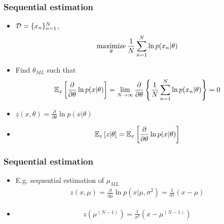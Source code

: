 \documentclass[10pt,mathserif]{beamer}
\begin{document}
\begin{frame}
\frametitle{Sequential estimation}
\begin{itemize}
\item 
$\mathcal{D} = \{x_n\}_{n=1}^N$,
\begin{align}
\operatorname*{maximize}_{\theta} \frac{1}{N} \sum_{n=1}^N \ln p(x_n|\theta) \nonumber
\end{align}
\item Find $\theta_{ML}$ such that
\begin{align}
    \mathbb{E}_x \left[\frac{\partial}{\partial \theta} \ln p(x|\theta)\right] = \lim_{N\rightarrow \infty}\frac{\partial}{\partial \theta} \left\{\frac{1}{N} \sum_{n=1}^N \ln p(x_n|\theta) \right\} = 0\nonumber
\end{align}
\item $z(x, \theta)=\frac{\partial}{\partial \theta} \ln p(x|\theta)$
\item 
\begin{align}
    \mathbb{E}_z \left[z|\theta \right] = \mathbb{E}_x \left[\frac{\partial}{\partial \theta} \ln p(x|\theta)\right]  \nonumber
\end{align}
\end{itemize}
\end{frame}

\begin{frame}
\frametitle{Sequential estimation}
\begin{itemize}
\item E.g. sequential estimation of $\mu_{ML}$
\begin{align}
    z(x, \mu) = \frac{\partial}{\partial \mu}\ln p(x|\mu,\sigma^2) = \frac{1}{\sigma^2}(x-\mu)\nonumber
\end{align}
\item 
\begin{align}
    z(\mu^{(N-1)}) = \frac{1}{\sigma^2} (x- \mu^{(N-1)})\nonumber
\end{align}
\end{itemize}
\end{frame}
\end{document}
